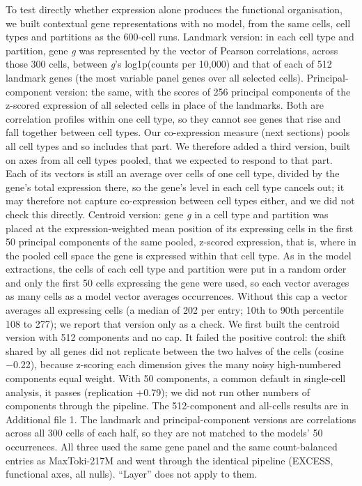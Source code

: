 \documentclass[
  11pt,
]{article}
\begin{document}
To test directly whether expression alone produces the functional
organisation, we built contextual gene representations with no model,
from the same cells, cell types and partitions as the 600-cell runs.
Landmark version: in each cell type and partition, gene \emph{g} was
represented by the vector of Pearson correlations, across those 300
cells, between \emph{g}'s log1p(counts per 10,000) and that of each of
512 landmark genes (the most variable panel genes over all selected
cells). Principal-component version: the same, with the scores of 256
principal components of the z-scored expression of all selected cells in
place of the landmarks. Both are correlation profiles within one cell
type, so they cannot see genes that rise and fall together between cell
types. Our co-expression measure (next sections) pools all cell types
and so includes that part. We therefore added a third version, built on
axes from all cell types pooled, that we expected to respond to that
part. Each of its vectors is still an average over cells of one cell
type, divided by the gene's total expression there, so the gene's level
in each cell type cancels out; it may therefore not capture
co-expression between cell types either, and we did not check this
directly. Centroid version: gene \emph{g} in a cell type and partition
was placed at the expression-weighted mean position of its expressing
cells in the first 50 principal components of the same pooled, z-scored
expression, that is, where in the pooled cell space the gene is
expressed within that cell type. As in the model extractions, the cells
of each cell type and partition were put in a random order and only the
first 50 cells expressing the gene were used, so each vector averages as
many cells as a model vector averages occurrences. Without this cap a
vector averages all expressing cells (a median of 202 per entry; 10th to
90th percentile 108 to 277); we report that version only as a check. We
first built the centroid version with 512 components and no cap. It
failed the positive control: the shift shared by all genes did not
replicate between the two halves of the cells (cosine −0.22), because
z-scoring each dimension gives the many noisy high-numbered components
equal weight. With 50 components, a common default in single-cell
analysis, it passes (replication +0.79); we did not run other numbers of
components through the pipeline. The 512-component and all-cells results
are in Additional file 1. The landmark and principal-component versions
are correlations across all 300 cells of each half, so they are not
matched to the models' 50 occurrences. All three used the same gene
panel and the same count-balanced entries as MaxToki-217M and went
through the identical pipeline (EXCESS, functional axes, all nulls).
``Layer'' does not apply to them.
\end{document}
